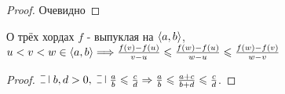 \begin{proof}
    Очевидно
\end{proof}

\begin{namedlemma}{О трёх хордах} 
    $f$ - выпуклая на $\left\langle {a, b} \right\rangle$, $u < v < w \in \left\langle {a, b} \right\rangle \Longrightarrow \\ \frac{f(v) - f(u)}{v - u} \leqslant \frac{f(w) - f(u)}{w - u} \leqslant \frac{f(w) - f(v)}{w - v} $
\end{namedlemma}

\begin{proof}
    $\letus\; b, d > 0, \; \letus \; \frac{a}{b} \leqslant \frac{c}{d} \Rightarrow \frac{a}{b} \leqslant \frac{a + c}{b + d} \leqslant \frac{c}{d}$.
\end{proof}

